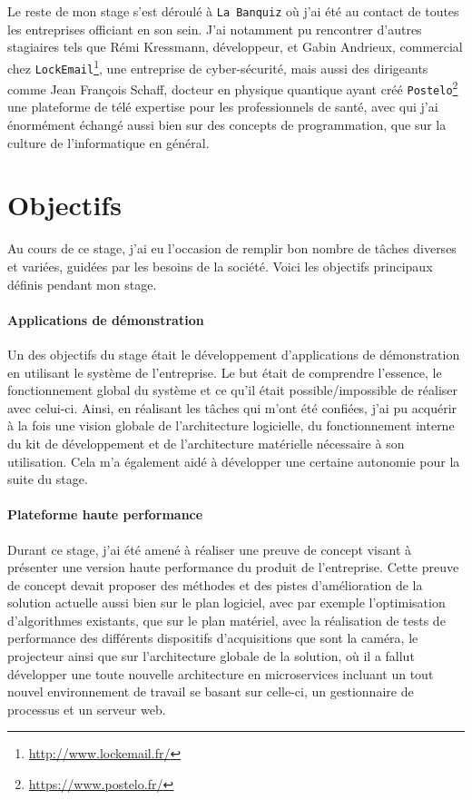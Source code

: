 Le reste de mon stage s'est déroulé à \texttt{La Banquiz} où j'ai été au contact de toutes les entreprises officiant en son sein. J'ai notamment pu rencontrer d'autres stagiaires tels que Rémi Kressmann, développeur, et Gabin Andrieux, commercial chez \texttt{LockEmail}\footnote{\href{http://www.lockemail.fr/}{http://www.lockemail.fr/}}, une entreprise de cyber-sécurité, mais aussi des dirigeants comme Jean François Schaff, docteur en physique quantique ayant créé  \texttt{Postelo}\footnote{\href{https://www.postelo.fr/}{https://www.postelo.fr/}} une plateforme de télé expertise pour les professionnels de santé, avec qui j'ai énormément échangé aussi bien sur des concepts de programmation, que sur la culture de l'informatique en général.

\section{Objectifs}

Au cours de ce stage, j'ai eu l'occasion de remplir bon nombre de tâches diverses et variées, guidées par les besoins de la société. Voici les objectifs principaux définis pendant mon stage.

\paragraph{Applications de démonstration} Un des objectifs du stage était le développement d'applications de démonstration en utilisant le système de l'entreprise. Le but était de comprendre l'essence, le fonctionnement global du système et ce qu'il était possible/impossible de réaliser avec celui-ci. Ainsi, en réalisant les tâches qui m'ont été confiées, j'ai pu acquérir à la fois une vision globale de l'architecture logicielle, du fonctionnement interne du kit de développement et de l'architecture matérielle nécessaire à son utilisation. Cela m'a également aidé à développer une certaine autonomie pour la suite du stage.

\paragraph{Plateforme haute performance} Durant ce stage, j'ai été amené à réaliser une preuve de concept visant à présenter une version haute performance du produit de l'entreprise. Cette preuve de concept devait proposer des méthodes et des pistes d'amélioration de la solution actuelle aussi bien sur le plan logiciel, avec par exemple l'optimisation d'algorithmes existants, que sur le plan matériel, avec la réalisation de tests de performance des différents dispositifs d'acquisitions que sont la caméra, le projecteur ainsi que sur l'architecture globale de la solution, où il a fallut développer une toute nouvelle architecture en microservices incluant un tout nouvel environnement de travail se basant sur celle-ci, un gestionnaire de processus et un serveur web.


